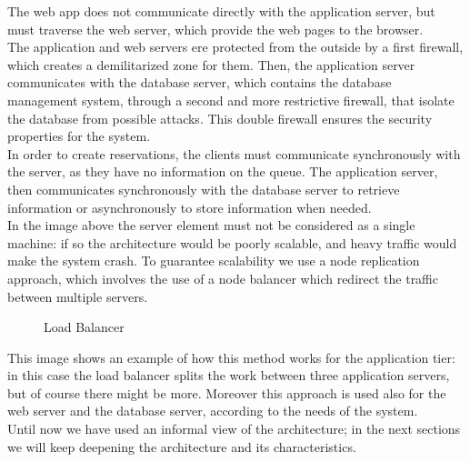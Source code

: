 The web app does not communicate directly with the application server, but must traverse the web server, which provide the web pages to the browser.\\
The application and web servers ere protected from the outside by a first firewall, which creates a demilitarized zone for them. Then, the application server communicates with the database server, which contains the database management system, through a second and more restrictive firewall, that isolate the database from possible attacks. This double firewall ensures the security properties for the system.\\
In order to create reservations, the clients must communicate synchronously with the server, as they have no information on the queue. The application server, then communicates synchronously with the database server to retrieve information or asynchronously to store information when needed.\\
In the image above the server element must not be considered as a single machine: if so the architecture would be poorly scalable, and heavy traffic would make the system crash. To guarantee scalability we use a node replication approach, which involves the use of a node balancer which redirect the traffic between multiple servers.\newline
\begin{figure}[H]
	\noindent
	\caption{Load Balancer} 
\end{figure}
This image shows an example of how this method works for the application tier: in this case the load balancer splits the work between three application servers, but of course there might be more. Moreover this approach is used also for the web server and the database server, according to the needs of the system.\\
Until now we have used an informal view of the architecture; in the next sections we will keep deepening the architecture and its characteristics.\newpage
